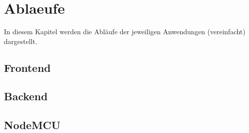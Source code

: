 \section{Ablaeufe}\label{Ablaeufe}
In diesem Kapitel werden die Abläufe der jeweiligen Anwendungen (vereinfacht) dargestellt.
\subsection{Frontend}
\subsection{Backend}
\subsection{NodeMCU}

